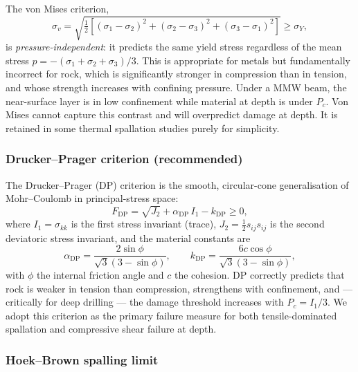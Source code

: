 \documentclass[12pt, a4paper]{article}
\begin{document}
The von Mises criterion,
\begin{equation}
    \sigma_v = \sqrt{\tfrac{1}{2}\!\left[
        (\sigma_1-\sigma_2)^2 + (\sigma_2-\sigma_3)^2 + (\sigma_3-\sigma_1)^2
        \right]} \ge \sigma_Y,
    \label{eq:vonmises}
\end{equation}
is \emph{pressure-independent}: it predicts the same yield stress regardless of
the mean stress $p = -(\sigma_1+\sigma_2+\sigma_3)/3$.  This is appropriate for
metals but fundamentally incorrect for rock, which is significantly stronger in
compression than in tension, and whose strength increases with confining pressure.
Under a MMW beam, the near-surface layer is in low confinement while material at
depth is under $P_c$.  Von Mises cannot capture this contrast and will overpredict
damage at depth.  It is retained in some thermal spallation studies
\citep{hu2018lrst} purely for simplicity.

\subsubsection{Drucker--Prager criterion (recommended)}

The Drucker--Prager (DP) criterion is the smooth, circular-cone generalisation
of Mohr--Coulomb in principal-stress space:
\begin{equation}
    F_\mathrm{DP} = \sqrt{J_2} + \alpha_\mathrm{DP}\,I_1 - k_\mathrm{DP} \ge 0,
    \label{eq:DP}
\end{equation}
where $I_1 = \sigma_{kk}$ is the first stress invariant (trace),
$J_2 = \tfrac{1}{2}s_{ij}s_{ij}$ is the second deviatoric stress invariant, and
the material constants are
\begin{equation}
    \alpha_\mathrm{DP} = \frac{2\sin\phi}{\sqrt{3}(3 - \sin\phi)},
    \qquad
    k_\mathrm{DP} = \frac{6c\cos\phi}{\sqrt{3}(3 - \sin\phi)},
    \label{eq:DP_params}
\end{equation}
with $\phi$ the internal friction angle and $c$ the cohesion.  DP correctly
predicts that rock is weaker in tension than compression, strengthens with
confinement, and — critically for deep drilling — the damage threshold increases
with $P_c = I_1/3$.  We adopt this criterion as the primary failure measure for
both tensile-dominated spallation and compressive shear failure at depth.

\subsubsection{Hoek--Brown spalling limit}
\end{document}

